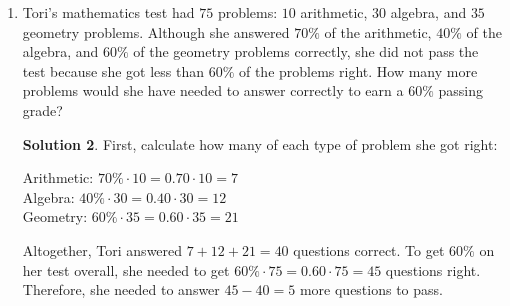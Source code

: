 \documentclass{article}
\theoremstyle{definition}
\newtheorem*{solution}{Solution}
\begin{document}
\begin{multicols}{2}
\begin{enumerate}
\begin{center}
            \end{center}
            \begin{solution}
                The largest sum occurs when $13$ is placed in the center.
                The sum is $13 + 10 + 1 = 13 + 7 + 4 = 24$.
                Note: Two other common sums, $18$ and $21$, are also possible.
            \end{solution}
        \item Tori's mathematics test had $75$ problems: $10$ arithmetic, $30$ algebra, and $35$ geometry problems.
            Although she answered $70\%$ of the arithmetic, $40\%$ of the algebra, and $60\%$ of the geometry problems correctly, she did not pass the test because she got less than $60\%$ of the problems right.
            How many more problems would she have needed to answer correctly to earn a $60\%$ passing grade?
            \begin{solution}
                First, calculate how many of each type of problem she got right:
                \begin{displayquote}
                    Arithmetic: $70\% \cdot 10 = 0.70 \cdot 10 = 7$ \\
                    Algebra: $40\% \cdot 30 = 0.40 \cdot 30 = 12$ \\
                    Geometry: $60\% \cdot 35 = 0.60 \cdot 35 = 21$
                \end{displayquote}
                Altogether, Tori answered $7 + 12 + 21 = 40$ questions correct.
                To get $60\%$ on her test overall, she needed to get $60\% \cdot 75 = 0.60 \cdot 75 = 45$ questions right.
                Therefore, she needed to answer $45 - 40 = 5$ more questions to pass.
            \end{solution}
    \end{enumerate}
\end{multicols}
\end{document}
